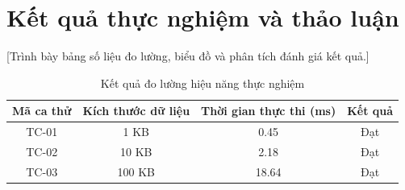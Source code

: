 \section{Kết quả thực nghiệm và thảo luận}
\label{sec:results}

[Trình bày bảng số liệu đo lường, biểu đồ và phân tích đánh giá kết quả.]

\begin{table}[H]
    \centering
    \caption{Kết quả đo lường hiệu năng thực nghiệm}
    \label{tab:sample_results}
    \begin{tabular}{|c|c|c|c|}
        \hline
        \textbf{Mã ca thử} & \textbf{Kích thước dữ liệu} & \textbf{Thời gian thực thi (ms)} & \textbf{Kết quả} \\ \hline
        TC-01 & 1 KB & 0.45 & Đạt \\ \hline
        TC-02 & 10 KB & 2.18 & Đạt \\ \hline
        TC-03 & 100 KB & 18.64 & Đạt \\ \hline
    \end{tabular}
\end{table}
